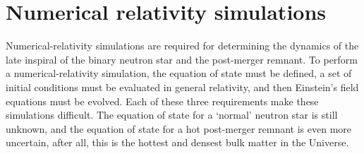 \documentclass[../Thesis.tex]{subfiles}
\begin{document}
    




    \section{Numerical relativity simulations}

    
    Numerical-relativity simulations are required for determining the dynamics of the late inspiral of the binary neutron star and the post-merger remnant.
    To perform a numerical-relativity simulation, the equation of state must be defined, a set of initial conditions must be evaluated in general relativity, and then Einstein's field equations must be evolved.
    Each of these three requirements make these simulations difficult.
    The equation of state for a `normal' neutron star is still unknown, and the equation of state for a hot post-merger remnant is even more uncertain, after all, this is the hottest and densest bulk matter in the Universe.

    
    
    
    
    \par
\end{document}
